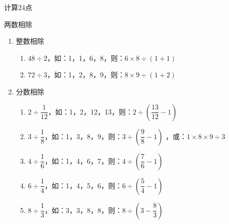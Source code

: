 \documentclass[aspectratio=169]{ctexbeamer} %
\begin{document}
\begin{frame}[t]{计算24点}
\begin{spacing}{1.0}
\normalsize
\alert{两数相除}
\begin{enumerate}[label={\arabic*.}]
\item 整数相除
	\begin{enumerate}[label={\Alph*.}]
	\item $48 \div 2$，如：1，1，6，8，则：$6 \times 8 \div (1 + 1)$
	\item $72 \div 3$，如：1，2，8，9，则：$8 \times 9 \div (1 + 2)$
	\end{enumerate}
\item 分数相除
	\begin{enumerate}[label={\Alph*.}]
	\item $2 \div \dfrac{1}{12}$，如：1，2，12，13，则：$2 \div \left(\dfrac{13}{12} - 1 \right)$
	\item $3 \div \dfrac{1}{8}$，如：1，3，8，9，则：$3 \div \left(\dfrac{9}{8} - 1 \right)$	，或：$1 \times 8 \times 9 \div 3$
	\item $4 \div \dfrac{1}{6}$，如：1，4，6，7，则：$4 \div \left(\dfrac{7}{6} - 1 \right)$	
	\item $6 \div \dfrac{1}{4}$，如：1，4，5，6，则：$6 \div \left(\dfrac{5}{4} - 1 \right)$	
	\item $8 \div \dfrac{1}{3}$，如：3，3，8，8，则：$8 \div \left(3 - \dfrac{8}{3} \right)$	
	\end{enumerate}
\end{enumerate}
\end{spacing}
\end{frame}
\end{document}
